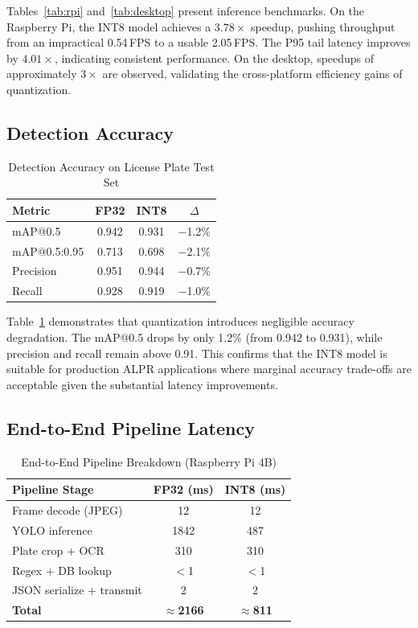 \documentclass[conference]{IEEEtran}
\begin{document}
Tables~\ref{tab:rpi} and~\ref{tab:desktop} present inference benchmarks. On the Raspberry Pi, the INT8 model achieves a $3.78\times$ speedup, pushing throughput from an impractical 0.54\,FPS to a usable 2.05\,FPS. The P95 tail latency improves by $4.01\times$, indicating consistent performance. On the desktop, speedups of approximately $3\times$ are observed, validating the cross-platform efficiency gains of quantization.

\subsection{Detection Accuracy}

\begin{table}[htbp]
\caption{Detection Accuracy on License Plate Test Set}
\label{tab:accuracy}
\centering
\begin{tabular}{lccc}
\toprule
\textbf{Metric} & \textbf{FP32} & \textbf{INT8} & \textbf{$\Delta$} \\
\midrule
mAP@0.5       & 0.942 & 0.931 & $-$1.2\% \\
mAP@0.5:0.95  & 0.713 & 0.698 & $-$2.1\% \\
Precision      & 0.951 & 0.944 & $-$0.7\% \\
Recall         & 0.928 & 0.919 & $-$1.0\% \\
\bottomrule
\end{tabular}
\end{table}

Table~\ref{tab:accuracy} demonstrates that quantization introduces negligible accuracy degradation. The mAP@0.5 drops by only 1.2\% (from 0.942 to 0.931), while precision and recall remain above 0.91. This confirms that the INT8 model is suitable for production ALPR applications where marginal accuracy trade-offs are acceptable given the substantial latency improvements.

\subsection{End-to-End Pipeline Latency}

\begin{table}[htbp]
\caption{End-to-End Pipeline Breakdown (Raspberry Pi 4B)}
\label{tab:pipeline}
\centering
\begin{tabular}{lcc}
\toprule
\textbf{Pipeline Stage} & \textbf{FP32 (ms)} & \textbf{INT8 (ms)} \\
\midrule
Frame decode (JPEG)      & 12   & 12 \\
YOLO inference            & 1842 & 487 \\
Plate crop + OCR          & 310  & 310 \\
Regex + DB lookup         & $<$1 & $<$1 \\
JSON serialize + transmit & 2    & 2 \\
\midrule
\textbf{Total}           & \textbf{$\approx$2166} & \textbf{$\approx$811} \\
\bottomrule
\end{tabular}
\end{table}
\end{document}
